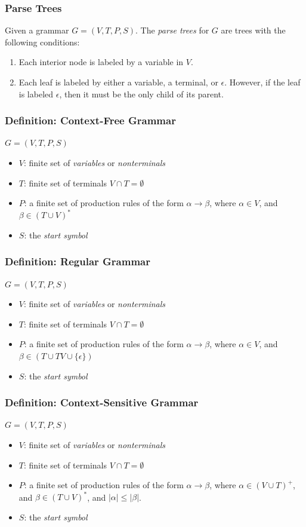 \documentclass[20pt]{article} %
\begin{document}
\subsubsection{Parse Trees}
Given a grammar $G = (V, T, P, S)$. The \textit{parse trees} for $G$ are trees with the following conditions:
\begin{enumerate}
\item Each interior node is labeled by a variable in $V$.
\item Each leaf is labeled by either a variable, a terminal, or $\epsilon$. However, if the leaf is labeled $\epsilon$, then it must be the only child of its parent.
\end{enumerate}
\subsubsection{Definition: \textbf{Context-Free Grammar}}
$G = (V, T, P, S)$
\begin{itemize}
\item $V$: finite set of \textit{variables} or \textit{nonterminals}
\item $T$: finite set of terminals $V \cap T = \emptyset$
\item $P$: a finite set of production rules of the form $\alpha \rightarrow \beta$, where $\alpha \in V$, and $\beta \in (T \cup V)^{*}$
\item $S$: the \textit{start symbol}
\end{itemize}
\subsubsection{Definition: \textbf{Regular Grammar}}
$G = (V, T, P, S)$
\begin{itemize}
\item $V$: finite set of \textit{variables} or \textit{nonterminals}
\item $T$: finite set of terminals $V \cap T = \emptyset$
\item $P$: a finite set of production rules of the form $\alpha \rightarrow \beta$, where $\alpha \in V$, and $\beta \in (T \cup TV \cup \{ \epsilon \})$
\item $S$: the \textit{start symbol}
\end{itemize}
\subsubsection{Definition: \textbf{Context-Sensitive Grammar}}
$G = (V, T, P, S)$
\begin{itemize}
\item $V$: finite set of \textit{variables} or \textit{nonterminals}
\item $T$: finite set of terminals $V \cap T = \emptyset$
\item $P$: a finite set of production rules of the form $\alpha \rightarrow \beta$, where $\alpha \in (V \cup T)^{+}$, and $\beta \in (T \cup V)^{*}$, and $|\alpha| \leq |\beta|$.
\item $S$: the \textit{start symbol}
\end{itemize}
\end{document}
